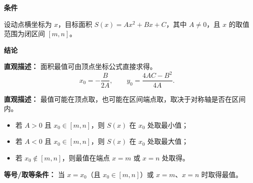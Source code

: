 \begin{statementbox}
	\textbf{\textcolor{CStatement}{条件}}
	\begin{description}[style=nextline, leftmargin=2.8em, labelsep=0.5em, itemsep=0.35em]
		\item[\textbf{\textcolor{CStatement}{条件1（二次函数形式）：}}]
			设动点横坐标为 $x$，目标面积 $S(x)=Ax^{2}+Bx+C$，其中 $A\neq 0$，且 $x$ 的取值范围为闭区间 $[m,n]$。
	\end{description}
	\textbf{\textcolor{CStatement}{结论}}
	\begin{description}[style=nextline, leftmargin=2.8em, labelsep=0.5em, itemsep=0.45em]
		\item[\textbf{\textcolor{CStatement}{结论一（顶点公式）：}}]
			\textbf{\textcolor{CStatement}{直观描述：}}
			面积最值可由顶点坐标公式直接求得。
			\[
				x_{0}=-\frac{B}{2A},
				\qquad
				y_{0}=\frac{4AC-B^{2}}{4A}.
			\]
		\item[\textbf{\textcolor{CStatement}{推广结论（区间端点判定）：}}]
			\textbf{\textcolor{CStatement}{直观描述：}}
			最值可能在顶点取，也可能在区间端点取，取决于对称轴是否在区间内。
			\begin{itemize}
			\item 若 $A>0$ 且 $x_{0}\in[m,n]$，则 $S(x)$ 在 $x_{0}$ 处取最小值；
			\item 若 $A<0$ 且 $x_{0}\in[m,n]$，则 $S(x)$ 在 $x_{0}$ 处取最大值；
			\item 若 $x_{0}\notin[m,n]$，则最值在端点 $x=m$ 或 $x=n$ 处取得。
		\end{itemize}

	\end{description}
	\textbf{\textcolor{CStatement}{等号/取等条件：}}
	当 $x=x_{0}$（且 $x_{0}\in[m,n]$）或 $x=m$、$x=n$ 时取得最值。
\end{statementbox}
